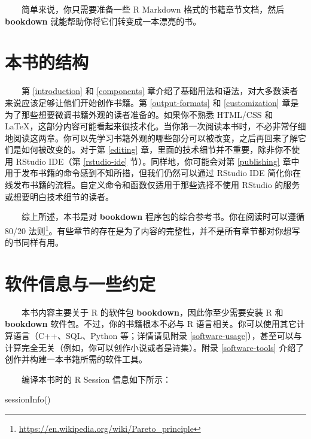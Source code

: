 \documentclass[
  12pt,
]{krantz}
\newenvironment{Shaded}{\begin{snugshade}}{\end{snugshade}}
\newcommand{\FunctionTok}[1]{\textcolor[rgb]{0.00,0.00,0.00}{#1}}
\newcommand{\NormalTok}[1]{#1}
\renewcommand{\href}[2]{#2\footnote{\url{#1}}}
\theoremstyle{definition}
\theoremstyle{definition}
\theoremstyle{definition}
\theoremstyle{definition}
\theoremstyle{remark}
\begin{document}
  简单来说，你只需要准备一些 R Markdown 格式的书籍章节文档，然后 \textbf{bookdown} 就能帮助你将它们转变成一本漂亮的书。

\hypertarget{ux672cux4e66ux7684ux7ed3ux6784}{%
\section*{本书的结构}\label{ux672cux4e66ux7684ux7ed3ux6784}}


  第 \ref{introduction} 和 \ref{components} 章介绍了基础用法和语法，对大多数读者来说应该足够让他们开始创作书籍。第 \ref{output-formats} 和 \ref{customization} 章是为了那些想要微调书籍外观的读者准备的。如果你不熟悉 HTML/CSS 和 LaTeX，这部分内容可能看起来很技术化。当你第一次阅读本书时，不必非常仔细地阅读这两章。你可以先学习书籍外观的哪些部分可以被改变，之后再回来了解它们是如何被改变的。对于第 \ref{editing} 章，里面的技术细节并不重要，除非你不使用 RStudio IDE（第 \ref{rstudio-ide} 节）。同样地，你可能会对第 \ref{publishing} 章中用于发布书籍的命令感到不知所措，但我们仍然可以通过 RStudio IDE 简化你在线发布书籍的流程。自定义命令和函数仅适用于那些选择不使用 RStudio 的服务或想要明白技术细节的读者。

  综上所述，本书是对 \textbf{bookdown} 程序包的综合参考书。你在阅读时可以遵循 \href{https://en.wikipedia.org/wiki/Pareto_principle}{80/20 法则}。有些章节的存在是为了内容的完整性，并不是所有章节都对你想写的书同样有用。

\hypertarget{ux8f6fux4ef6ux4fe1ux606fux4e0eux4e00ux4e9bux7ea6ux5b9a}{%
\section*{软件信息与一些约定}\label{ux8f6fux4ef6ux4fe1ux606fux4e0eux4e00ux4e9bux7ea6ux5b9a}}


  本书内容主要关于 R 的软件包 \textbf{bookdown}，因此你至少需要安装 R 和 \textbf{bookdown} 软件包。不过，你的书籍根本不必与 R 语言相关。你可以使用其它计算语言（C++、SQL、Python 等；详情请见附录 \ref{software-usage}），甚至可以与计算完全无关（例如，你可以创作小说或者是诗集）。附录 \ref{software-tools} 介绍了创作并构建一本书籍所需的软件工具。

  编译本书时的 R Session 信息如下所示：

\begin{Shaded}
\begin{Highlighting}[]
\FunctionTok{sessionInfo}\NormalTok{()}
\end{Highlighting}
\end{Shaded}
\end{document}

